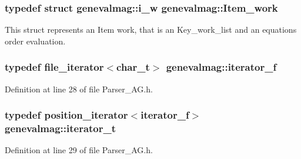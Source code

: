 \hypertarget{namespacegenevalmag_abb601d42781f0764762a8e5a8ded19c6}{
\subsubsection[{Item\_\-work}]{\setlength{\rightskip}{0pt plus 5cm}typedef struct {\bf genevalmag::i\_\-w}  {\bf genevalmag::Item\_\-work}}}
\label{namespacegenevalmag_abb601d42781f0764762a8e5a8ded19c6}
This struct represents an Item work, that is an Key\_\-work\_\-list and an equations order evaluation. \hypertarget{namespacegenevalmag_a068de0c39bd97e0f3fe3e3c805632e4b}{
\subsubsection[{iterator\_\-f}]{\setlength{\rightskip}{0pt plus 5cm}typedef file\_\-iterator$<${\bf char\_\-t}$>$ {\bf genevalmag::iterator\_\-f}}}
\label{namespacegenevalmag_a068de0c39bd97e0f3fe3e3c805632e4b}


Definition at line 28 of file Parser\_\-AG.h.

\hypertarget{namespacegenevalmag_a64946721fb97e58be670a468bf8e7056}{
\subsubsection[{iterator\_\-t}]{\setlength{\rightskip}{0pt plus 5cm}typedef position\_\-iterator$<${\bf iterator\_\-f}$>$ {\bf genevalmag::iterator\_\-t}}}
\label{namespacegenevalmag_a64946721fb97e58be670a468bf8e7056}


Definition at line 29 of file Parser\_\-AG.h.

